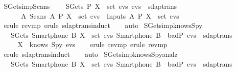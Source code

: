 \begin{isabellebody}
  \isanewline
  \isamarkupfalse%
  \ SGets{\isacharunderscore}imp{\isacharunderscore}Scans\ {\isacharcolon}\isanewline
  \ \ {\isachardoublequoteopen}{\isasymlbrakk}\ SGets\ P\ X\ {\isasymin}\ set\ evs{\isacharsemicolon}\ evs\ {\isasymin}\ sdaptrans\ {\isasymrbrakk}\ \isanewline
  \ \ \ \ {\isasymLongrightarrow}\ {\isasymexists}\ A{\isachardot}\ {\isacharparenleft}Scans\ A\ P\ X\ {\isasymin}\ set\ evs{\isacharparenright}\ {\isasymor}\ {\isacharparenleft}Inputs\ A\ P\ X\ {\isasymin}\ set\ evs{\isacharparenright}{\isachardoublequoteclose}\isanewline
  \isadelimproof
  \isanewline
  \ \ %
  \endisadelimproof
  \isatagproof
  \isamarkupfalse%
  \ {\isacharparenleft}erule\ rev{\isacharunderscore}mp{\isacharcomma}\ erule\ sdaptrans{\isachardot}induct{\isacharparenright}\isanewline
  \ \ \isamarkupfalse%
  \ {\isacharparenleft}auto{\isacharparenright}\isanewline
  \isamarkupfalse%
  \endisatagproof
  {\isafoldproof}%
  \isadelimproof
  \isanewline
  \endisadelimproof
  \isanewline
  \isamarkupfalse%
  \ SGets{\isacharunderscore}imp{\isacharunderscore}knows{\isacharunderscore}Spy\ {\isacharcolon}\isanewline
  \ \ {\isachardoublequoteopen}{\isasymlbrakk}\ SGets\ {\isacharparenleft}Smartphone\ B{\isacharparenright}\ X\ {\isasymin}\ set\ evs{\isacharsemicolon}\ {\isacharparenleft}Smartphone\ B{\isacharparenright}\ {\isasymin}\ badP{\isacharsemicolon}\ evs\ {\isasymin}\ sdaptrans\ {\isasymrbrakk}\isanewline
  \ \ \ \ {\isasymLongrightarrow}\ X\ {\isasymin}\ knows\ Spy\ evs{\isachardoublequoteclose}\isanewline
  \isadelimproof
  \isanewline
  \ \ %
  \endisadelimproof
  \isatagproof
  \isamarkupfalse%
  \ {\isacharparenleft}erule\ rev{\isacharunderscore}mp{\isacharcomma}\ erule\ rev{\isacharunderscore}mp{\isacharparenright}\isanewline
  \ \ \isamarkupfalse%
  \ {\isacharparenleft}erule\ sdaptrans{\isachardot}induct{\isacharparenright}\isanewline
  \ \ \isamarkupfalse%
  \ {\isacharparenleft}auto{\isacharparenright}\isanewline
  \isamarkupfalse%
  \endisatagproof
  {\isafoldproof}%
  \isadelimproof
  \isanewline
  \endisadelimproof
  \isanewline
  \isamarkupfalse%
  \ SGets{\isacharunderscore}imp{\isacharunderscore}knows{\isacharunderscore}Spy{\isacharunderscore}analz\ {\isacharcolon}\isanewline
  \ \ {\isachardoublequoteopen}{\isasymlbrakk}\ SGets\ {\isacharparenleft}Smartphone\ B{\isacharparenright}\ X\ {\isasymin}\ set\ evs{\isacharsemicolon}\ {\isacharparenleft}Smartphone\ B{\isacharparenright}\ {\isasymin}\ badP{\isacharsemicolon}\ evs\ {\isasymin}\ sdaptrans\ {\isasymrbrakk}\isanewline

\end{isabellebody}
